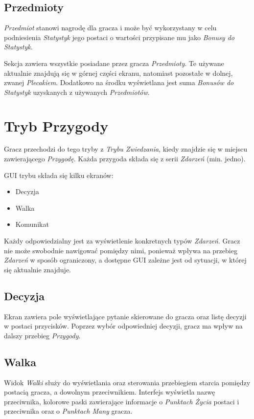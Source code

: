 \documentclass[openright]{xmgr}
\begin{document}
\subsection*{Przedmioty}
\textit{Przedmiot} stanowi nagrodę dla gracza i może być wykorzystany w celu podniesienia \textit{Statystyk} jego postaci o wartości przypisane mu jako \textit{Bonusy do Statystyk}.

Sekcja zawiera wszystkie posiadane przez gracza \textit{Przedmioty}. Te używane aktualnie znajdują się w górnej części ekranu, natomiast pozostałe w dolnej, zwanej \textit{Plecakiem}. Dodatkowo na środku wyświetlana jest suma \textit{Bonusów do Statystyk} uzyskanych z używanych \textit{Przedmiotów}.

\section{Tryb Przygody}

Gracz przechodzi do tego tryby z \textit{Trybu Zwiedzania}, kiedy znajdzie się w miejscu zawierającego \textit{Przygodę}. Każda przygoda składa się z serii \textit{Zdarzeń} (min. jedno).

GUI trybu składa się kilku ekranów:
\begin{itemize}
	\item Decyzja
	\item Walka
	\item Komunikat
\end{itemize}

Każdy odpowiedzialny jest za wyświetlenie konkretnych typów \textit{Zdarzeń}. Gracz nie może swobodnie nawigować pomiędzy nimi, ponieważ wpływa na przebieg \textit{Zdarzeń} w sposób ograniczony, a dostępne GUI zależne jest od sytuacji, w której się aktualnie znajduje.
\subsection*{Decyzja}
Ekran zawiera pole wyświetlające pytanie skierowane do gracza oraz listę decyzji w postaci przycisków. Poprzez wybór odpowiedniej decyzji, gracz ma wpływ na dalszy przebieg \textit{Przygody}.
\subsection*{Walka}
Widok \textit{Walki} służy do wyświetlania oraz sterowania przebiegiem starcia pomiędzy postacią gracza, a dowolnym przeciwnikiem. Interfejs wyświetla nazwę przeciwnika, kolorowe paski zawierające informacje o \textit{Punktach Życia} postaci i przeciwnika oraz o \textit{Punktach Many} gracza. 
\end{document}
